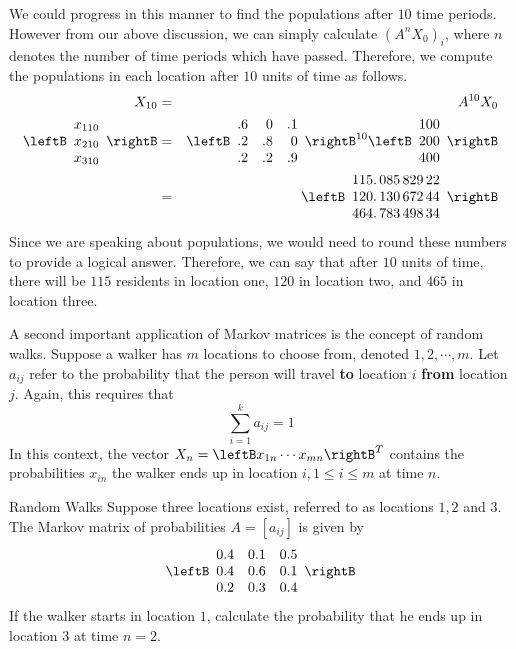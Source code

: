 \begin{solution}
We could progress in this manner to find the populations after $10$ time periods. However from our above discussion, we can simply calculate $\left( A^{n}X_0\right) _{i}$, 
where $n$ denotes the number of time periods which have passed. Therefore, we compute the populations in each location after $10$ units of time as follows. 
\begin{eqnarray*}
X_{10} &=& A^{10}X_0 \\
\leftB \begin{array}{r}
x_{1 10} \\
x_{2 10} \\
x_{3 10} 
\end{array}
\rightB 
&=& 
\leftB
\begin{array}{rrr}
.6 & 0 & .1 \\
.2 & .8 & 0 \\
.2 & .2 & .9
\end{array}
\rightB ^{10}\leftB
\begin{array}{r}
100 \\
200 \\
400
\end{array}
\rightB \\
&=&  \leftB
\begin{array}{c}
115.\,\allowbreak 085\,829\,22 \\
120.\,\allowbreak 130\,672\,44 \\
464.\,\allowbreak 783\,498\,34
\end{array}
\rightB
\end{eqnarray*}
Since we are speaking about populations, we would need to round these numbers to provide a logical 
answer. Therefore, we can say that after $10$ units of time, there will be $115$ residents in location one, $120$ in location two,
and $465$ in location three.
\end{solution}

A second important application of Markov matrices is the concept of  random walks. Suppose a walker has $m$ locations to choose from, denoted $1, 2, \cdots, m$. Let $a_{ij}$ refer to the probability that the person will travel \textbf{to}  location $i$ \textbf{from} location $j$. Again, this requires that
\[
\sum_{i=1}^{k}a_{ij}=1
\]
In this context, the vector $X_n=\leftB x_{1n} \cdots x_{mn}\rightB ^{T}$ contains the probabilities $x_{in}$ the walker ends up in location $i, 1\leq i \leq m$ at time $n$. 

\begin{example}{Random Walks}\label{exa:randomwalks}
Suppose three locations exist, referred to as locations $1, 2$ and $3$. The Markov matrix of probabilities $A = [a_{ij}]$ is given by
\[
\leftB
\begin{array}{rrr}
0.4 & 0.1 & 0.5 \\
0.4 & 0.6 & 0.1 \\
0.2 & 0.3 & 0.4
\end{array}
\rightB
\]
If the walker starts in location $1$, calculate the probability that he ends up in location $3$ at time $n = 2$. 
\end{example}

